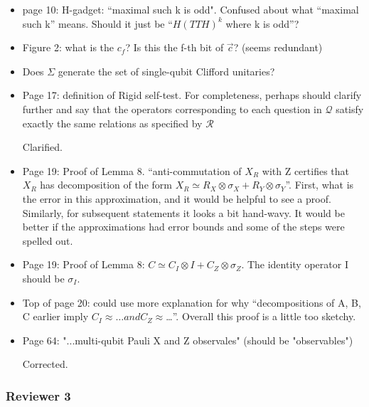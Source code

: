 \documentclass[12pt]{article}
\begin{document}
\begin{itemize}
\item page 10: H-gadget: “maximal such k is odd". Confused about what “maximal such k” means. Should it just be “$H(TTH)^k$ where k is odd”?

\item Figure 2: what is the $c_f$? Is this the f-th bit of $\vec{c}$? (seems redundant)

\item Does $\Sigma$ generate the set of single-qubit Clifford unitaries?

\item Page 17: definition of Rigid self-test. For completeness, perhaps should clarify further and say that the operators corresponding to each question in $\mathcal{Q}$ satisfy exactly the same relations as specified by $\mathcal{R}$

				{\color{blue} Clarified.}

\item Page 19: Proof of Lemma 8. “anti-commutation of $X_R$ with Z certifies that $X_R$ has decomposition of the form $X_R \simeq R_X \otimes \sigma_X + R_Y \otimes \sigma_Y$”. First, what is the error in this approximation, and it would be helpful to see a proof. Similarly, for subsequent statements it looks a bit hand-wavy. It would be better if the approximations had error bounds and some of the steps were spelled out. 

\item Page 19: Proof of Lemma 8: $C \simeq C_I \otimes I + C_Z \otimes \sigma_Z$. The identity operator I should be $\sigma_I$. 

\item Top of page 20: could use more explanation for why “decompositions of A, B, C earlier imply $C_I \approx… and C_Z \approx$…”. Overall this proof is a little too sketchy.

\item Page 64: "...multi-qubit Pauli X and Z observales" (should be "observables")

{\color{blue} Corrected.}

\end{itemize}

\subsubsection*{Reviewer 3}
\end{document}
